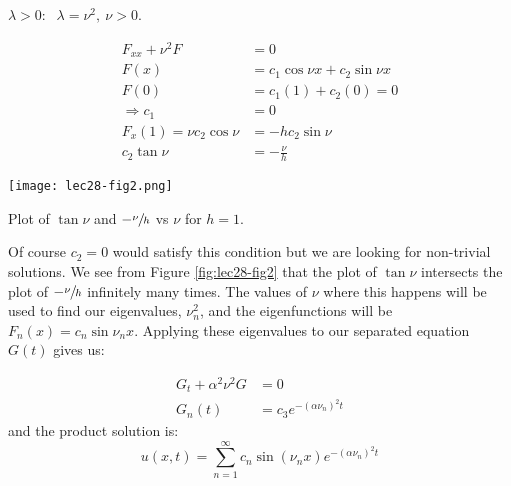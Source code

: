 \vspace{5.0cm}

\noindent \underline{$\lambda > 0$}: $\ \ \lambda = \nu^2, \ \nu>0$.

\begin{align*}
F_{xx} + \nu^2 F &= 0  \\
F(x) &= c_1 \cos{\nu x} + c_2 \sin{\nu x} \\
F(0) &= c_1 (1) + c_2 (0) = 0 \\
\Rightarrow c_1 &= 0 \\
F_{x}(1) = \nu c_2 \cos{\nu} &= -h c_2 \sin{\nu} \\
c_2 \tan{\nu} &= -\frac{\nu}{h}
\end{align*}
\begin{marginfigure}
\texttt{[image: lec28-fig2.png]}
\caption{Plot of $\tan{\nu}$ and $-\sfrac{\nu}{h}$ vs $\nu$ for $h=1$.}
\label{fig:lec28-fig2}
\end{marginfigure}
Of course $c_2 = 0$ would satisfy this condition but we are looking for non-trivial solutions.  We see from Figure \ref{fig:lec28-fig2} that the plot of $\tan{\nu}$ intersects the plot of $-\sfrac{\nu}{h}$ infinitely many times.  The values of $\nu$ where this happens will be used to find our eigenvalues, $\nu_n^2$, and the eigenfunctions will be $F_n(x) = c_n \sin{\nu_n x}$.  Applying these eigenvalues to our separated equation $G(t)$ gives us:

\begin{align*}
G_{t} + \alpha^2 \nu^2 G &= 0 \\
G_n(t) &= c_3e^{-\left(\alpha \nu_n \right)^2 t}
\end{align*}
and the product solution is:
\begin{equation*}
u(x,t) = \sum\limits_{n=1}^{\infty} c_n \sin{(\nu_n x)}e^{-\left(\alpha \nu_n \right)^2t}
\end{equation*}

\vspace{0.25cm}

